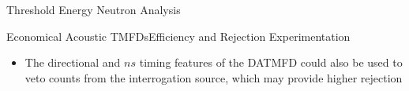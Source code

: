\begin{pucol}{7}{12}
\begin{pucell}{7}{6}{Threshold Energy Neutron Analysis}{}
\begin{pucell}{3}{3}{Economical Acoustic TMFDs}{Efficiency and Rejection Experimentation}
\begin{itemize}
      \item The directional and $ns$ timing features of the DATMFD could also be used to veto counts from the interrogation source, which may provide higher rejection
    \end{itemize}
  \end{pucell}%
  \hspace*{\fill}
  \begin{pucell}{2}{3}{}{}
  \end{pucell}%
  \hspace*{\fill}
  \begin{pucell}{2}{3}{}{}
  \end{pucell} \\
  \vspace*{\fill}
\end{pucell}%
\end{pucol}%
\hspace*{1.5in}
